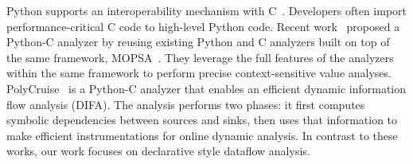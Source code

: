 Python supports an interoperability mechanism with C~\cite{PythonC}.
Developers often import performance-critical C code to high-level Python code.
Recent work~\cite{sas2021} proposed a Python-C analyzer by reusing existing
Python and C analyzers built on top of the same framework, MOPSA~\cite{Mopsa}.
They leverage the full features of the analyzers within the same framework to
perform precise context-sensitive value analyses.  PolyCruise~\cite{polycruise}
is a Python-C analyzer that enables an efficient dynamic information flow
analysis (DIFA).  The analysis performs two phases: it first computes symbolic
dependencies between sources and sinks, then uses that information to make
efficient instrumentations for online dynamic analysis.  In contrast to these
works, our work focuses on declarative style dataflow analysis.
